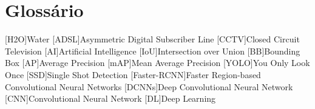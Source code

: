 \chapter{Glossário}

\footnotesize
\SingleSpacing

\begin{multicols}{2}
\begin{acronym}[AAAAAA]

	[H2O]{Water}
	[ADSL]{Asymmetric Digital Subscriber Line}
	[CCTV]{Closed Circuit Television}
	[AI]{Artificial Intelligence}
	[IoU]{Intersection over Union}
	[BB]{Bounding Box}
	[AP]{Average Precision}
	[mAP]{Mean Average Precision}
	[YOLO]{You Only Look Once}
	[SSD]{Single Shot Detection}
	[Faster-RCNN]{Faster Region-based Convolutional Neural Networks}
	[DCNNs]{Deep Convolutional Neural Network}
	[CNN]{Convolutional Neural Network}
	[DL]{Deep Learning}
\end{acronym}
\end{multicols}

